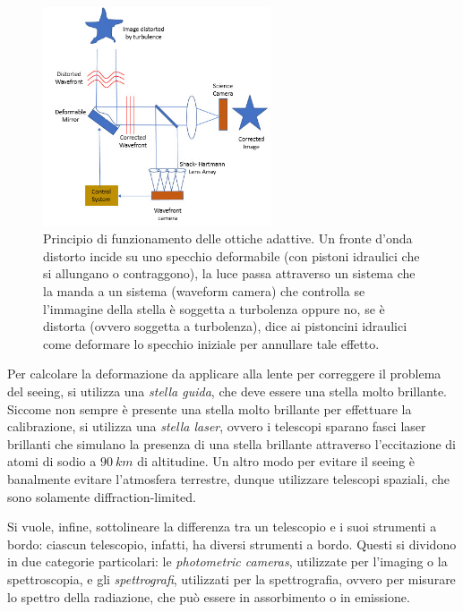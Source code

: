 \begin{figure}
\centering
\includegraphics[width=0.6\textwidth]{immagini/ottiche-adattive.png}
\caption{Principio di funzionamento delle ottiche adattive. Un fronte d’onda distorto incide su uno specchio deformabile (con pistoni idraulici che si allungano o contraggono), la luce passa attraverso un sistema che la manda a un sistema (waveform camera) che controlla se l’immagine della stella è soggetta a turbolenza oppure no, se è distorta (ovvero soggetta a turbolenza), dice ai pistoncini idraulici come deformare lo specchio iniziale per annullare tale effetto.}
\label{fig:ottiche-adattive}
\end{figure}

Per calcolare la deformazione da applicare alla lente per correggere il problema del seeing, si utilizza una \emph{stella guida}, che deve essere una stella molto brillante. Siccome non sempre è presente una stella molto brillante per effettuare la calibrazione, si utilizza una \emph{stella laser}, ovvero i telescopi sparano fasci laser brillanti che simulano la presenza di una stella brillante attraverso l'eccitazione di atomi di sodio a $\SI{90}{km}$ di altitudine. Un altro modo per evitare il seeing è banalmente evitare l'atmosfera terrestre, dunque utilizzare telescopi spaziali, che sono solamente diffraction-limited.

Si vuole, infine, sottolineare la differenza tra un telescopio e i suoi strumenti a bordo: ciascun telescopio, infatti, ha diversi strumenti a bordo. Questi si dividono in due categorie particolari: le \emph{photometric cameras}, utilizzate per l'imaging o la spettroscopia, e gli \emph{spettrografi}, utilizzati per la spettrografia, ovvero per misurare lo spettro della radiazione, che può essere in assorbimento o in emissione.